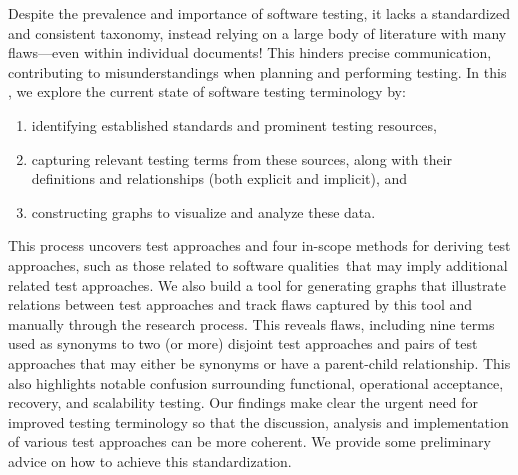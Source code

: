\label{abstract}%
Despite the prevalence and importance of software testing, it lacks
a standardized and consistent taxonomy, instead relying on a large body of
literature with many flaws---even within individual documents! This hinders
precise communication, contributing to misunderstandings when planning and
performing testing. In this \docType{}, we %
explore the current state of software testing terminology by:
\begin{enumerate}
    \item identifying established standards and prominent testing resources,
    \item capturing relevant testing terms from these sources, along with their
          definitions and relationships (both explicit and implicit), and
    \item constructing graphs to visualize and analyze these data.
\end{enumerate}
This process uncovers \approachCount{} test approaches and
\ifnotpaper four in-scope methods for deriving test approaches, such as those
    related to \fi \qualityCount{} software qualities\ifnotpaper\else\ that may
    imply additional related test approaches\fi. We also build
a tool for generating graphs that illustrate relations between test
approaches and track flaws captured by this tool and manually through
the research process. This reveals \flawCount{} flaws,
including nine terms used as synonyms to two (or more) disjoint test approaches
and \parSynCount{} pairs of test approaches that may either be synonyms or have
a parent-child relationship. This also highlights notable confusion surrounding
functional, operational acceptance, recovery, and scalability testing. Our
findings make clear the urgent need for improved testing terminology so that
the discussion, analysis and implementation of various test approaches can be
more coherent. We provide some preliminary advice on how to achieve this
standardization.